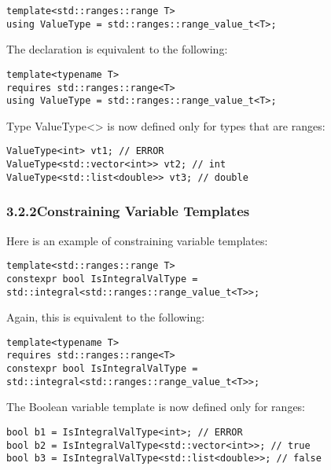 \begin{lstlisting}[style=styleCXX]
template<std::ranges::range T>
using ValueType = std::ranges::range_value_t<T>;
\end{lstlisting}

The declaration is equivalent to the following:

\begin{lstlisting}[style=styleCXX]
template<typename T>
requires std::ranges::range<T>
using ValueType = std::ranges::range_value_t<T>;
\end{lstlisting}

Type ValueType<> is now defined only for types that are ranges:

\begin{lstlisting}[style=styleCXX]
ValueType<int> vt1; // ERROR
ValueType<std::vector<int>> vt2; // int
ValueType<std::list<double>> vt3; // double
\end{lstlisting}

\subsubsection*{ 3.2.2\hspace{0.2cm}Constraining Variable Templates}

Here is an example of constraining variable templates:

\begin{lstlisting}[style=styleCXX]
template<std::ranges::range T>
constexpr bool IsIntegralValType = std::integral<std::ranges::range_value_t<T>>;
\end{lstlisting}

Again, this is equivalent to the following:

\begin{lstlisting}[style=styleCXX]
template<typename T>
requires std::ranges::range<T>
constexpr bool IsIntegralValType = std::integral<std::ranges::range_value_t<T>>;
\end{lstlisting}

The Boolean variable template is now defined only for ranges:

\begin{lstlisting}[style=styleCXX]
bool b1 = IsIntegralValType<int>; // ERROR
bool b2 = IsIntegralValType<std::vector<int>>; // true
bool b3 = IsIntegralValType<std::list<double>>; // false
\end{lstlisting}


